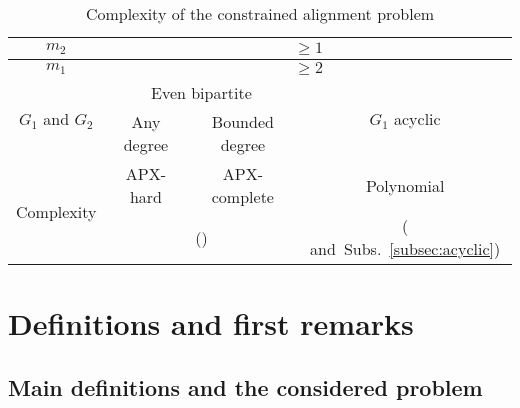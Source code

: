\documentclass[final]{dmtcs-episciences}
\begin{document}
\begin{center}
\begin{table}[ht]
\centering
\footnotesize
\begin{tabular}{|c|c|c|c|}

\hline 
$m_2$ &\multicolumn{3}{|c|}{$\geq 1$}\\
\hline
$m_1$ &\multicolumn{3}{|c|}{$\geq 2$}\\

\hline
\multirow{2}{*}{$G_1$ and $G_2$}&\multicolumn{2}{|c|}{ 
Even bipartite}&\multirow{2}{*}{$G_1$ acyclic}\\
\cline{2-3}
&Any degree & Bounded degree&\\
\hline
\hline
\multirow{2}{*}{Complexity}  &APX-hard&APX-complete&Polynomial\\
&\multicolumn{2}{|c|}{(\citet{Fertin200990})}&(\citet{AbakaBE13} and~Subs.~\ref{subsec:acyclic})\\
\hline
\end{tabular}
\caption{Complexity of the constrained alignment problem}
\label{table-complex}
\end{table}
\end{center}





\newpage
 

 \section{Definitions and first remarks}\label{sec:definitions}

\subsection{Main definitions and the considered problem}\label{sub:def}
\end{document}
